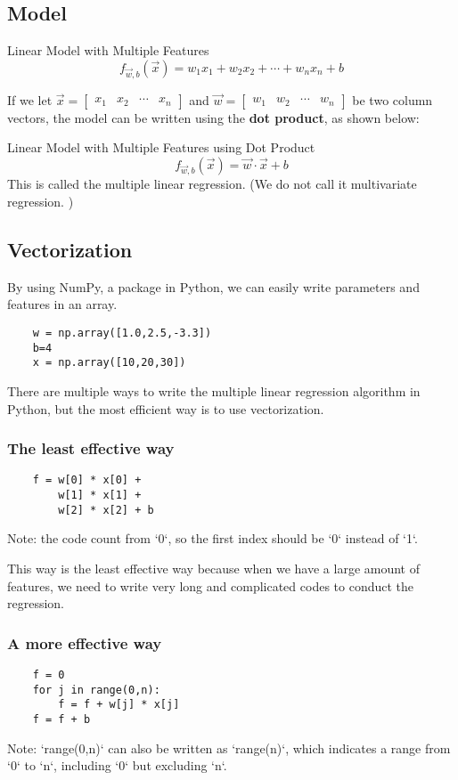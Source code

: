 \documentclass[12pt,a4paper]{article}
\begin{document}
\subsection{Model}
\begin{thmbox}{Linear Model with Multiple Features}
	$$f_{\vec{w},b}\left(\vec{x}\right)=w_1x_1+w_2x_2+\cdots+w_nx_n+b$$
\end{thmbox}
If we let $\vec{x}=\begin{bmatrix}x_1&x_2&\cdots&x_n\end{bmatrix}$ and $\vec{w}=\begin{bmatrix}w_1&w_2&\cdots&w_n\end{bmatrix}$ be two column vectors, the model can be written using the \textbf{dot product}, as shown below: 
\begin{thmbox}{Linear Model with Multiple Features using Dot Product}
	$$f_{\vec{w},b}\left(\vec{x}\right)=\vec{w}\cdot\vec{x}+b$$
	This is called the multiple linear regression. (We do not call it multivariate regression. )	
\end{thmbox}

\subsection{Vectorization}
\quad By using NumPy, a package in Python, we can easily write parameters and features in an array. 
\begin{lstlisting}
	w = np.array([1.0,2.5,-3.3])
	b=4
	x = np.array([10,20,30])
\end{lstlisting}

There are multiple ways to write the multiple linear regression algorithm in Python, but the most efficient way is to use vectorization. 

\subsubsection{The least effective way}
\begin{lstlisting}
	f = w[0] * x[0] + 
		w[1] * x[1] + 
		w[2] * x[2] + b
\end{lstlisting}
Note: the code count from `0`, so the first index should be `0` instead of `1`. 

This way is the least effective way because when we have a large amount of features, we need to write very long and complicated codes to conduct the regression.

\subsubsection{A more effective way}
\begin{lstlisting}
	f = 0
	for j in range(0,n): 
		f = f + w[j] * x[j]
	f = f + b
\end{lstlisting}
Note: `range(0,n)` can also be written as `range(n)`, which indicates a range from `0` to `n`, including `0` but excluding `n`. 
\end{document}
